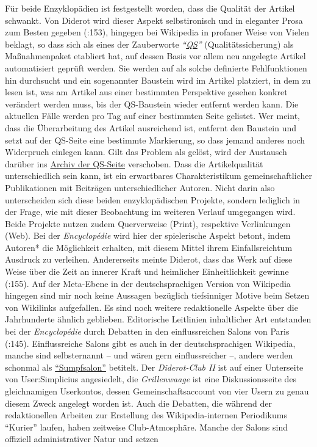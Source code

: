 \documentclass[fontsize=12pt]{scrartcl}
\begin{document}
F\"ur beide Enzyklop\"adien ist festgestellt worden, dass die Qualit\"at der Artikel schwankt. Von Diderot wird dieser Aspekt selbstironisch und in eleganter Prosa zum Besten gegeben (\cite{Blom2004}:153), hingegen bei Wi\-ki\-pe\-dia in profaner Weise von Vielen beklagt, so dass sich als eines der Zauberworte \textit{"`\href{https://de.wikipedia.org/wiki/Wikipedia:QS}{QS}"'} (Qualit\"atssicherung) als Ma{\ss}nahmenpaket etabliert hat, auf dessen Basis vor allem neu angelegte Artikel automatisiert gepr\"uft werden. Sie werden auf als solche definierte Fehlfunktionen hin durchsucht und ein sogenannter Baustein wird im Artikel platziert, in dem zu lesen ist, was am Artikel aus einer bestimmten Perspektive gesehen konkret ver\"andert werden muss, bis der QS-Baustein wieder entfernt werden kann. Die aktuellen F\"alle werden pro Tag auf einer bestimmten Seite gelistet. Wer meint, dass die \"Uberarbeitung des Artikel ausreichend ist, entfernt den Baustein und setzt auf der QS-Seite eine bestimmte Markierung, so dass jemand anderes noch Widerpruch einlegen kann. Gilt das Pro\-blem als gel\"ost, wird der Austausch dar\"uber ins \href{https://de.wikipedia.org/wiki/Wikipedia:Qualit\%C3\%A4tssicherung/Archiv#Alte_QS-Seiten}{Archiv der QS-Seite} verschoben. Dass die Artikelqualit\"at unter\-schied\-lich sein kann, ist ein erwartbares Charakteristikum gemeinschaftlicher Pu\-blikationen mit Beitr\"agen unterschiedlicher Autoren\textsuperscript{\tiny *}. Nicht darin also unterscheiden sich diese beiden enzyklop\"adischen Projekte, sondern lediglich in der Frage, wie mit dieser Beobachtung im weiteren Verlauf umgegangen wird. Beide Projekte nutzen zudem Querverweise (Print), respektive Verlinkungen (Web). Bei der \textit{Encyclop\'{e}die} wird \mbox{hier} der spielerische Aspekt betont, indem Autoren* die M\"oglichkeit erhalten, mit diesem Mittel ihrem Einfallsreichtum Ausdruck zu verleihen. An\-de\-rerseits meinte Diderot, dass das Werk auf diese Weise \"uber die Zeit an innerer Kraft und heimlicher Einheitlichkeit gewinne (\cite{Blom2004}:155). Auf der Meta-Ebene in der deutschspra\-chi\-gen Version von Wi\-ki\-pe\-dia hingegen sind mir noch keine Aussagen bez\"uglich tiefsinniger Motive beim Setzen von Wikilinks aufgefallen. Es sind noch weitere redaktionelle Aspekte \"uber die Jahrhunderte \"ahnlich geblieben. Editorische Leitlinien inhaltlicher Art entstanden bei der \textit{Encyclop\'{e}die} durch Debatten in den einflussreichen Salons von Paris (\cite{Blom2004}:145). Einflussreiche Salons gibt es auch in der deutschspra\-chi\-gen Wi\-ki\-pe\-dia, manche sind selbsternannt -- und w\"aren gern einflussreicher --, andere werden schonmal als \href{https://de.wikipedia.org/w/index.php?title=Benutzer:Simplicius\%2FDiderot-Club_II\&diff=next\&oldid=136141510}{"`Sumpfsalon"'} betitelt. Der \textit{Diderot-Club II} ist auf einer Unterseite von \mbox{User}:Simplicius angesiedelt, die \textit{Grillenwaage} ist eine Dis\-kus\-si\-onsseite des gleichnamigen Userkontos, dessen Gemeinschaftsaccount von \mbox{vier} Usern zu genau diesem Zweck angelegt worden ist. Auch die Debatten, die w\"ahrend der redaktionellen Arbei\-ten zur Erstellung des Wi\-ki\-pe\-dia-internen Periodikums "`Kurier"' laufen, haben zeitweise Club-Atmosph\"are. Manche der Salons sind offiziell administrativer Natur und setzen 
\end{document}

